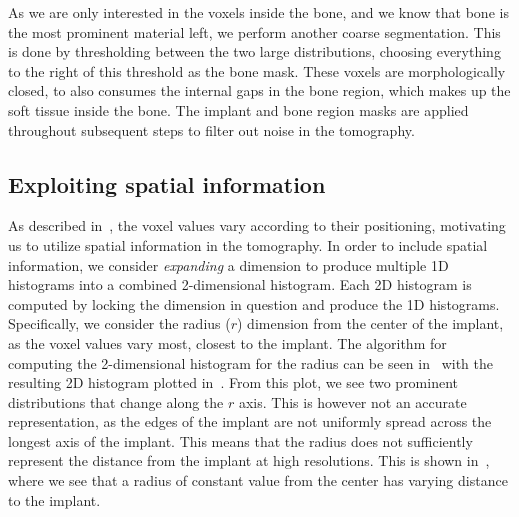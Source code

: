 As we are only interested in the voxels inside the bone, and we know that bone is the most prominent
material left, we perform another coarse segmentation. This is done by thresholding between the two
large distributions, choosing everything to the right of this threshold as the bone mask. These voxels
are morphologically closed, to also consumes the internal gaps in the bone region, which makes up the
soft tissue inside the bone. The implant and bone region masks are applied throughout subsequent steps
to filter out noise in the tomography.

\subsection{Exploiting spatial information}
As described in~, the voxel values vary according to their positioning, motivating
us to utilize spatial information in the tomography. In order to include spatial information,
we consider \textit{expanding} a dimension to produce multiple 1D histograms into a combined 2-dimensional
histogram. Each 2D histogram is computed by locking the dimension in question and produce the 1D histograms.
Specifically, we consider the radius ($r$) dimension from the center of the implant, as the voxel values
vary most, closest to the implant. The algorithm for computing the 2-dimensional histogram for the
radius can be seen in~ with the resulting 2D histogram plotted in~.
From this plot, we see two prominent distributions that change along the $r$ axis. This is however
not an accurate representation, as the edges of the implant are not uniformly spread across the longest
axis of the implant. This means that the radius does not sufficiently represent the distance from the
implant at high resolutions. This is shown in~, where we see that a radius
of constant value from the center has varying distance to the implant.


